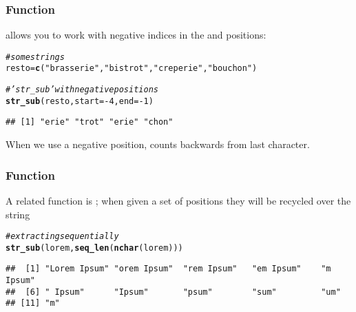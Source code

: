 \documentclass[12pt]{beamer}\usepackage[]{graphicx}\usepackage[]{color}
\makeatletter
\newcommand{\hlnum}[1]{\textcolor[rgb]{0.686,0.059,0.569}{#1}}%
\newcommand{\hlstr}[1]{\textcolor[rgb]{0.192,0.494,0.8}{#1}}%
\newcommand{\hlcom}[1]{\textcolor[rgb]{0.678,0.584,0.686}{\textit{#1}}}%
\newcommand{\hlopt}[1]{\textcolor[rgb]{0,0,0}{#1}}%
\newcommand{\hlstd}[1]{\textcolor[rgb]{0.345,0.345,0.345}{#1}}%
\newcommand{\hlkwb}[1]{\textcolor[rgb]{0.69,0.353,0.396}{#1}}%
\newcommand{\hlkwc}[1]{\textcolor[rgb]{0.333,0.667,0.333}{#1}}%
\newcommand{\hlkwd}[1]{\textcolor[rgb]{0.737,0.353,0.396}{\textbf{#1}}}%
\newenvironment{kframe}{%
 \def\at@end@of@kframe{}%
 \ifinner\ifhmode%
  \def\at@end@of@kframe{\end{minipage}}%
  \begin{minipage}{\columnwidth}%
 \fi\fi%
 \def\FrameCommand##1{\hskip\@totalleftmargin \hskip-\fboxsep
 \colorbox{shadecolor}{##1}\hskip-\fboxsep
     \hskip-\linewidth \hskip-\@totalleftmargin \hskip\columnwidth}%
 \MakeFramed {\advance\hsize-\width
   \@totalleftmargin\z@ \linewidth\hsize
   \@setminipage}}%
 {\par\unskip\endMakeFramed%
 \at@end@of@kframe}
\newenvironment{knitrout}{}{} %
\makeatother
\begin{document}

\begin{frame}[fragile]
\frametitle{Function }

 allows you to work with negative indices in the  and  positions:
\begin{knitrout}\footnotesize
{}\color{fgcolor}\begin{kframe}
\begin{alltt}
\hlcom{# some strings}
\hlstd{resto} \hlkwb{=} \hlkwd{c}\hlstd{(}\hlstr{"brasserie"}\hlstd{,} \hlstr{"bistrot"}\hlstd{,} \hlstr{"creperie"}\hlstd{,} \hlstr{"bouchon"}\hlstd{)}

\hlcom{# 'str_sub' with negative positions}
\hlkwd{str_sub}\hlstd{(resto,} \hlkwc{start}\hlstd{=}\hlopt{-}\hlnum{4}\hlstd{,} \hlkwc{end}\hlstd{=}\hlopt{-}\hlnum{1}\hlstd{)}
\end{alltt}
\begin{verbatim}
## [1] "erie" "trot" "erie" "chon"
\end{verbatim}
\end{kframe}
\end{knitrout}
When we use a negative position,  counts backwards from last character.

\end{frame}


\begin{frame}[fragile]
\frametitle{Function }

A related function is ; when given a set of positions they will be recycled over the string
\begin{knitrout}\footnotesize
{}\color{fgcolor}\begin{kframe}
\begin{alltt}
\hlcom{# extracting sequentially}
\hlkwd{str_sub}\hlstd{(lorem,} \hlkwd{seq_len}\hlstd{(}\hlkwd{nchar}\hlstd{(lorem)))}
\end{alltt}
\begin{verbatim}
##  [1] "Lorem Ipsum" "orem Ipsum"  "rem Ipsum"   "em Ipsum"    "m Ipsum"    
##  [6] " Ipsum"      "Ipsum"       "psum"        "sum"         "um"         
## [11] "m"
\end{verbatim}
\end{kframe}
\end{knitrout}

\end{frame}
\end{document}
